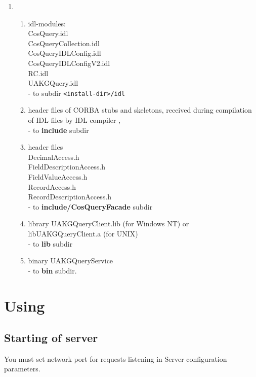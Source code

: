 \documentclass[10pt]{article}
\begin{document}
\begin{enumerate}
  \item
      \begin{enumerate}
      \item idl-modules: \\
            CosQuery.idl \\
            CosQueryCollection.idl \\
            CosQueryIDLConfig.idl \\
            CosQueryIDLConfigV2.idl \\
            RC.idl \\
            UAKGQuery.idl\\
            - to subdir \verb|<install-dir>/idl|  
      \item
            header files of CORBA stubs and skeletons, received 
            during compilation of IDL files by IDL compiler ,
            \\
            - to {\bf include} subdir
      \item
            header files \\
            DecimalAccess.h \\          
            FieldDescriptionAccess.h \\
            FieldValueAccess.h \\
            RecordAccess.h \\
            RecordDescriptionAccess.h \\
            - to {\bf include/CosQueryFacade} subdir
      \item
            library UAKGQueryClient.lib (for Windows NT) or libUAKGQueryClient.a (for UNIX)\\
            - to {\bf lib} subdir
      \item
            binary UAKGQueryService \\
            - to {\bf bin} subdir.
      \end{enumerate}
\end{enumerate}


\section{ Using }

\subsection{ Starting of server }

 You must set network port for requests listening in Server configuration
parameters.
\end{document}
